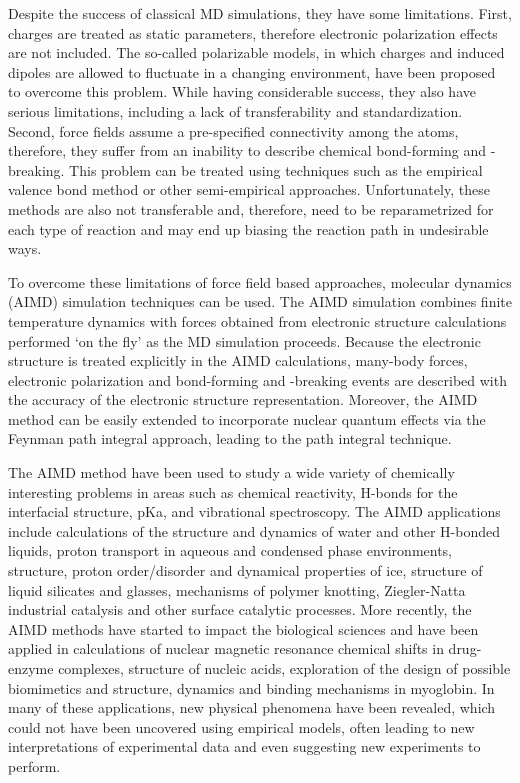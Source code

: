 Despite the success of classical MD simulations, they  have some limitations. First, charges
are treated as static parameters, therefore electronic polarization effects are
not included.  The so-called polarizable models\cite{Rick94,SWR02,Lamoureux03}, in which charges 
and induced dipoles are allowed to fluctuate in a changing environment, 
have been proposed to overcome this problem. 
While having considerable success, they also have serious limitations, including a lack of transferability 
and standardization\cite{TME02}. Second, force fields assume a pre-specified connectivity among the atoms, therefore, they suffer
from an inability to describe chemical bond-forming and -breaking. This problem
can be treated using techniques such as the empirical valence
bond method \cite{AW80} or other semi-empirical approaches. Unfortunately, these methods are also not
transferable and, therefore, need to be reparametrized for each type of reaction and may end
up biasing the reaction path in undesirable ways.

To overcome these limitations of force field based approaches, \abinitio molecular dynamics (AIMD) simulation techniques\cite{DKR90,MCP92,Allen1993,MET96,MP97,DM00,RC02}
can be used. The AIMD simulation combines finite temperature dynamics with forces
obtained from electronic structure calculations performed ‘on the fly’ as the MD simulation
proceeds\cite{DM00}. Because the electronic structure is treated explicitly in the AIMD calculations,
many-body forces, electronic polarization and bond-forming and -breaking events are described
with the accuracy of the electronic structure representation. Moreover, the AIMD
method can be easily extended to incorporate nuclear quantum effects via the Feynman
path integral approach\cite{RPF65,RPF72}, leading to the \abinitio path integral technique\cite{DM96,MT96,DM99}.

The AIMD method have been used to study a wide variety of chemically
interesting problems in areas such as chemical reactivity, H-bonds for the interfacial structure, pKa,
and vibrational spectroscopy. The AIMD applications include calculations of the structure and dynamics of water and other H-bonded liquids, 
proton transport in aqueous and condensed phase environments, structure, proton order/disorder and dynamical properties of ice, structure of
liquid silicates and glasses, mechanisms of polymer knotting, Ziegler-Natta industrial catalysis
and other surface catalytic processes. 
More recently, the AIMD methods have started to impact the
biological sciences and have been applied in calculations of nuclear magnetic resonance chemical shifts in 
drug-enzyme complexes, structure of nucleic acids, exploration of the design of possible
biomimetics and structure, dynamics and binding mechanisms in myoglobin.
In many of these applications, new physical phenomena have been revealed, which could
not have been uncovered using empirical models, often leading to new interpretations of
experimental data and even suggesting new experiments to perform\cite{TME02}.

